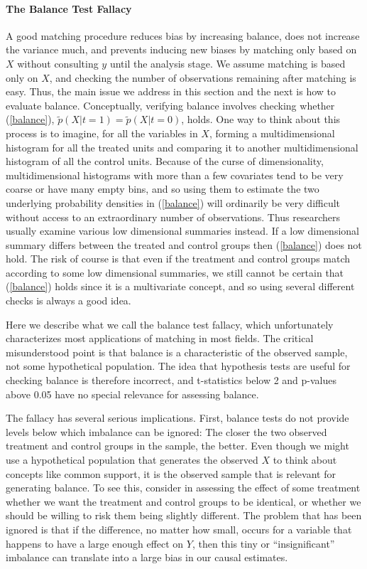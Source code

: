 \documentclass[11pt,titlepage]{article}
\begin{document}
\paragraph{The Balance Test Fallacy}

A good matching procedure reduces bias by increasing balance, does not
increase the variance much, and prevents inducing new biases by
matching only based on $X$ without consulting $y$ until the analysis
stage.  We assume matching is based only on $X$, and checking the
number of observations remaining after matching is easy.  Thus, the
main issue we address in this section and the next is how to evaluate
balance.  Conceptually, verifying balance involves checking whether
(\ref{balance}), $\tilde p(X|t=1)=\tilde p(X|t=0)$, holds.  One way to
think about this process is to imagine, for all the variables in $X$,
forming a multidimensional histogram for all the treated units and
comparing it to another multidimensional histogram of all the control
units.  Because of the curse of dimensionality, multidimensional
histograms with more than a few covariates tend to be very coarse or
have many empty bins, and so using them to estimate the two underlying
probability densities in (\ref{balance}) will ordinarily be very
difficult without access to an extraordinary number of observations.
Thus researchers usually examine various low dimensional summaries
instead.  If a low dimensional summary differs between the treated and
control groups then (\ref{balance}) does not hold.  The risk of course
is that even if the treatment and control groups match according to
some low dimensional summaries, we still cannot be certain that
(\ref{balance}) holds since it is a multivariate concept, and so using
several different checks is always a good idea.

Here we describe what we call the balance test fallacy, which
unfortunately characterizes most applications of matching in most
fields.  The critical misunderstood point is that balance is a
characteristic of the observed sample, not some hypothetical
population.  The idea that hypothesis tests are useful for checking
balance is therefore incorrect, and t-statistics below 2 and p-values
above 0.05 have no special relevance for assessing balance.

The fallacy has several serious implications.  First, balance tests do
not provide levels below which imbalance can be ignored: The closer
the two observed treatment and control groups in the sample, the
better.  Even though we might use a hypothetical population that
generates the observed $X$ to think about concepts like common
support, it is the observed sample that is relevant for generating
balance.  To see this, consider in assessing the effect of some
treatment whether we want the treatment and control groups to be
identical, or whether we should be willing to risk them being slightly
different.  The problem that has been ignored is that if the
difference, no matter how small, occurs for a variable that happens to
have a large enough effect on $Y$, then this tiny or ``insignificant''
imbalance can translate into a large bias in our causal estimates.
\end{document}
